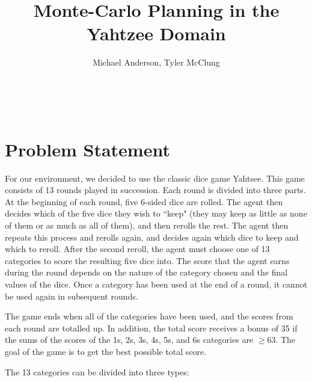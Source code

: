 \documentclass{article}
\author{Michael Anderson, Tyler McClung}
\title{Monte-Carlo Planning in the Yahtzee Domain}
\begin{document}
\maketitle
{}
\\
\flushleft
\newpage

\section{Problem Statement}

For our environment, we decided to use the classic dice game Yahtsee. This game
consists of 13 rounds played in succession. Each round is divided into three
parts. At the beginning of each round, five 6-sided dice are rolled. The agent
then decides which of the five dice they wish to ``keep" (they may keep as 
little
as none of them or as much as all of them), and then rerolls the rest. The
agent then repeats this process and rerolls again, and decides again which dice
to keep and which to reroll. After the second reroll, the agent must choose one
of 13 categories to score the resulting five dice into. The score that the
agent earns during the round depends on the nature of the category chosen and
the final values of the dice. Once a category has been used at the end of a
round, it cannot be used again in subsequent rounds.

\vspace{1em}

The game ends when all of
the categories have been used, and the scores from each round are totalled up. 
In addition, the total score receives a bonus of 35 if the sums of the scores of
the 1s, 2s, 3s, 4s, 5s, and 6s categories are $\ge 63$. The goal of the game is 
to get the best possible total score.

\vspace{1em}

The 13 categories can be divided into three types:
\end{document}
